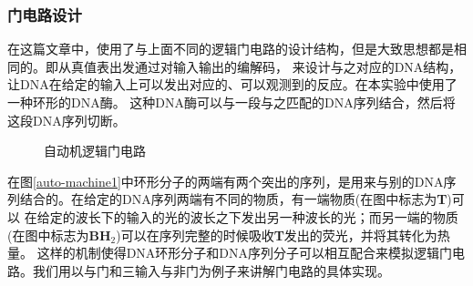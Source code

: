 \documentclass[a4paper,twoside]{article}
\begin{document}
\subsubsection{门电路设计}
在这篇文章中，使用了与上面不同的逻辑门电路的设计结构，但是大致思想都是相同的。即从真值表出发通过对输入输出的编解码，
来设计与之对应的DNA结构，让DNA在给定的输入上可以发出对应的、可以观测到的反应。在本实验中使用了一种环形的DNA酶。
这种DNA酶可以与一段与之匹配的DNA序列结合，然后将这段DNA序列切断。
\begin{figure}[htbp]
	\centering
	\caption{自动机逻辑门电路}
	\label{auto-machine-gate}
\end{figure}

在图\ref{auto-machine1}中环形分子的两端有两个突出的序列，是用来与别的DNA序列结合的。在给定的DNA序列两端有不同的物质，有一端物质(在图中标志为\textbf{T})可以
在给定的波长下的输入的光的波长之下发出另一种波长的光；而另一端的物质(在图中标志为\textbf{BH$_2$})可以在序列完整的时候吸收\textbf{T}发出的荧光，并将其转化为热量。
这样的机制使得DNA环形分子和DNA序列分子可以相互配合来模拟逻辑门电路。我们用以与门和三输入与非门为例子来讲解门电路的具体实现。
\end{document}
